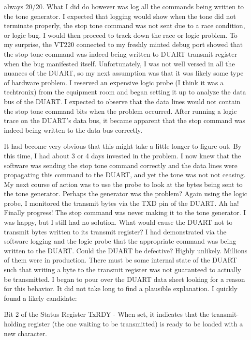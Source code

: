 always 20/20. What I did do however was log all the commands being written to
the tone generator. I expected that logging would show when the tone did not
terminate properly, the stop tone command was not sent due to a race condition,
or logic bug. I would then proceed to track down the race or logic problem. To
my surprise, the VT220 connected to my freshly minted debug port showed that the
stop tone command was indeed being written to DUART transmit register when the
bug manifested itself. Unfortunately, I was not well versed in all the nuances
of the DUART, so my next assumption was that it was likely some type of hardware
problem. I reserved an expensive logic probe (I think it was a techtronix) from
the equipment room and began setting it up to analyze the data bus of the DUART.
I expected to observe that the data lines would not contain the stop tone
command bits when the problem occurred. After running a logic trace on the
DUART's data bus, it became apparent that the stop command was indeed being
written to the data bus correctly.
\par
It had become very obvious that this might take a little longer to figure out.
By this time, I had about 3 or 4 days invested in the problem. I now knew that
the software was sending the stop tone command correctly and the data lines were
propagating this command to the DUART, and yet the tone was not not ceasing. My
next course of action was to use the probe to look at the bytes being sent to
the tone generator. Perhaps the generator was the problem? Again using the logic
probe, I monitored the transmit bytes via the TXD pin of the DUART. Ah ha!
Finally progress! The stop command was never making it to the tone generator. I
was happy, but I still had no solution. What would cause the DUART not to
transmit bytes written to its transmit register? I had demonstrated via the
software logging and the logic probe that the appropriate command was being
written to the DUART. Could the DUART be defective? Highly unlikely. Millions of
them were in production. There must be some internal state of the DUART such
that writing a byte to the transmit register was not guaranteed to actually be
transmitted. I began to pour over the DUART data sheet looking for a reason for
this behavior. It did not take long to find a plausible explanation. I quickly
found a likely candidate:

Bit 2 of the Status Register TxRDY - When set, it indicates that the
transmit-holding register (the one waiting to be transmitted) is ready to be
loaded with a new character.

